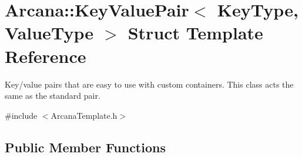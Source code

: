 \hypertarget{struct_arcana_1_1_key_value_pair}{}\section{Arcana\+:\+:Key\+Value\+Pair$<$ Key\+Type, Value\+Type $>$ Struct Template Reference}
\label{struct_arcana_1_1_key_value_pair}


Key/value pairs that are easy to use with custom containers. This class acts the same as the standard pair.  




{\ttfamily \#include $<$Arcana\+Template.\+h$>$}

\subsection*{Public Member Functions}
